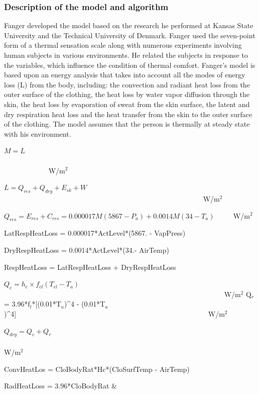 \subsubsection{Description of the model and algorithm}\label{description-of-the-model-and-algorithm}

Fanger developed the model based on the research he performed at Kansas State University and the Technical University of Denmark. Fanger used the seven-point form of a thermal sensation scale along with numerous experiments involving human subjects in various environments. He related the subjects in response to the variables, which influence the condition of thermal comfort. Fanger's model is based upon an energy analysis that takes into account all the modes of energy loss (L) from the body, including: the convection and radiant heat loss from the outer surface of the clothing, the heat loss by water vapor diffusion through the skin, the heat loss by evaporation of sweat from the skin surface, the latent and dry respiration heat loss and the heat transfer from the skin to the outer surface of the clothing. The model assumes that the person is thermally at steady state with his environment.

\(M = L\) ~~~~~~~~~~~~~~~~~~~~~~~~~~~~~~~~~~~~~~~~~~~~~~~~~~~~~~~~~~~~~~~~~~~~~~~~~~~~~~~~~~~~ W/m\(^{2}\)

\(L = {Q_{res}} + {Q_{dry}} + {E_{sk}} + W\) ~~~~~~~~~~~~~~~~~~~~~~~~~~~~~~~~~~~~~~~~~~~~~~~~~~~~~~~~ W/m\(^{2}\)

\({Q_{res}} = {E_{res}} + {C_{res}} = 0.000017M(5867 - {P_a}) + 0.0014M(34 - {T_a})\) ~~~~ W/m\(^{2}\)

LatRespHeatLoss = 0.000017*ActLevel*(5867. - VapPress)

DryRespHeatLoss = 0.0014*ActLevel*(34.- AirTemp)

RespHeatLoss = LatRespHeatLoss + DryRespHeatLoss

\({Q_c} = {h_c} \times {f_{cl}}({T_{cl}} - {T_a})\) ~~~~~~~~~~~~~~~~~~~~~~~~~~~~~~~~~~~~~~~~~~~~~~~~~~~~~~~~~~~~~~ W/m\(^{2}\) {Q\(_{r}\) = 3.96*f\(_{l}\)*{[}(0.01*T\(_{a}\))\^{}4 - (0.01*T\(_{a}\))\^{}4{]}}~~~~~~~~~~~~~~~~~~~~~~~~~~~~~~~~~~~~~~~~~~~~~~~~~~~~~~ W/m\(^{2}\)

\({Q_{dry}} = {Q_c} + {Q_r}\) ~~~~~~~~~~~~~~~~~~~~~~~~~~~~~~~~~~~~~~~~~~~~~~~~~~~~~~~~~~~~~~~~~~~~~~~~ W/m\(^{2}\)

ConvHeatLos = CloBodyRat*Hc*(CloSurfTemp - AirTemp)

RadHeatLoss = 3.96*CloBodyRat \&


